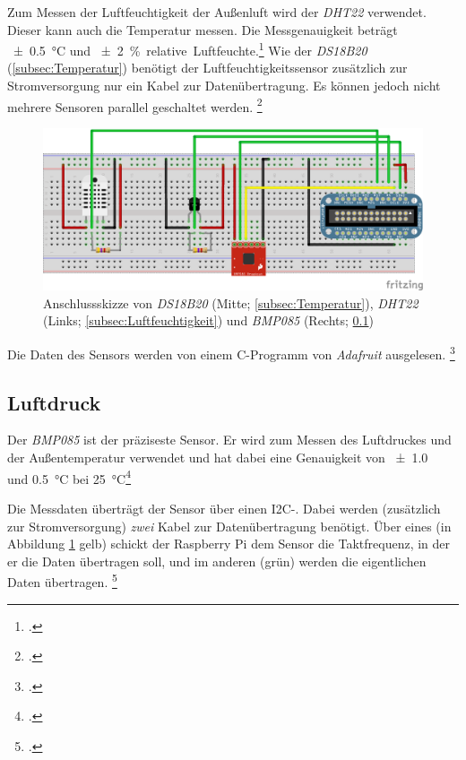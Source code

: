 Zum Messen der Luftfeuchtigkeit der Außenluft wird der \emph{DHT22} verwendet. Dieser kann auch die Temperatur messen. Die Messgenauigkeit beträgt \SI{\pm 0.5}{\degreeCelsius} und \SI{\pm 2}{\% .relative.Luftfeuchte}.\footcite{DHT22}
Wie der \emph{DS18B20} (\ref{subsec:Temperatur}) benötigt der Luftfeuchtigkeitssensor zusätzlich zur Stromversorgung nur ein Kabel zur Datenübertragung. Es können jedoch nicht mehrere Sensoren parallel geschaltet werden. \footcite[Wiring]{DHT}

\begin{figure}
  \centering
     \includegraphics[width=\textwidth]{figures/steckbrett.png}
  \caption{Anschlussskizze von \emph{DS18B20} (Mitte; \ref{subsec:Temperatur}), \emph{DHT22} (Links; \ref{subsec:Luftfeuchtigkeit}) und \emph{BMP085} (Rechts; \ref{subsec:Luftdruck})}
  \label{fig:steckbrett}
\end{figure}

Die Daten des Sensors werden von einem \gls{C}-Programm von \emph{Adafruit} ausgelesen.
\footcite[Software Install]{DHT}

\subsection{Luftdruck}
\label{subsec:Luftdruck}

Der \emph{BMP085} ist der präziseste Sensor. Er wird zum Messen des Luftdruckes und der Außentemperatur verwendet und hat dabei eine Genauigkeit von \SI{\pm 1.0}{\hecto{}} und \SI{0.5}{\degreeCelsius} bei \SI{25}{\degreeCelsius}\footcite[6]{BMP085}

Die Messdaten überträgt der Sensor über einen \gls{I2C}-. Dabei werden (zusätzlich zur Stromversorgung) \emph{zwei} Kabel zur Datenübertragung benötigt.
Über eines (in Abbildung \ref{fig:steckbrett} gelb) schickt der Raspberry Pi dem Sensor die Taktfrequenz, in der er die Daten übertragen soll, und im anderen (grün) werden die eigentlichen Daten übertragen.
\footcite[Hooking Everything Up]{bmp058_adafruit}

